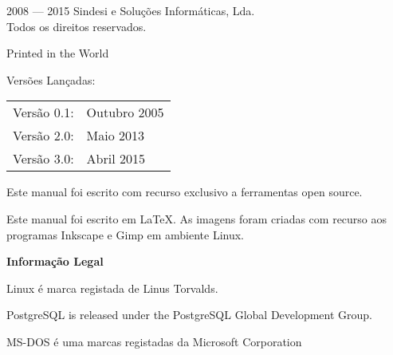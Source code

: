 \documentclass[a4paper,11pt,openany]{memoir}
\newcommand{\PWnote}[2]{}
\begin{document}
\PWnote{2009/06/26}{Updated the copyright page for 9th impression}
\begingroup
\footnotesize
\setlength{\parindent}{0pt}
\setlength{\parskip}{\baselineskip}
\textcopyright{} 2008 --- 2015 Sindesi e Soluções Informáticas, Lda. \\
Todos os direitos reservados.


Printed in the World 


\PWnote{2009/07/08}{Changed manual date to 8 July 2009}
\begin{center}
Versões Lançadas:
\end{center}
\begin{center}
\begin{tabular}{ll}
Versão 0.1:                        & Outubro 2005 \\
Versão 2.0:			& Maio 2013 \\
Versão 3.0:			& Abril 2015 \\
\end{tabular}
\end{center}

Este manual foi escrito com recurso exclusivo a ferramentas open source.

Este manual foi escrito em \LaTeX. As imagens foram criadas com  
recurso aos programas Inkscape e Gimp em ambiente Linux.


\textbf{Informação Legal}

Linux\textcopyright{} é marca registada de Linus Torvalds.

PostgreSQL\textcopyright{} is released under the PostgreSQL Global Development Group.


MS-DOS\textcopyright{} é uma marcas registadas da Microsoft Corporation  %



\endgroup


% 
\end{document}
